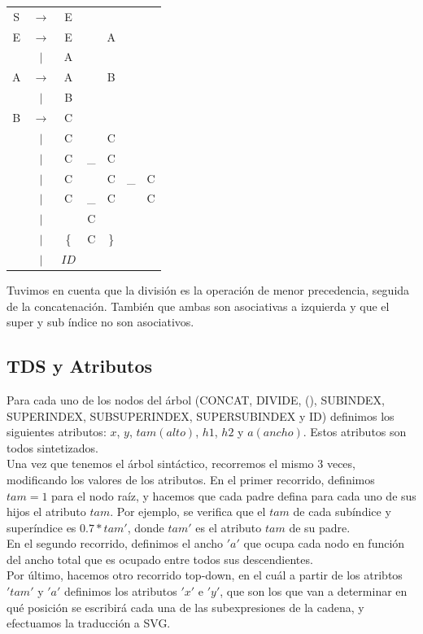 \documentclass[a4paper, 10pt, twoside]{article}
\begin{document}
\begin{table}[ht]
\begin{tabular} {c c c c c c c}

S & $\rightarrow$ & E &                   &   & & \\
E & $\rightarrow$ & E & \detokenize{/}    & A & & \\
  & $|$           & A &                   &   & & \\
A & $\rightarrow$ & A &                   & B & & \\
  & $|$           & B &                   &   & & \\
B & $\rightarrow$ & C &                   &   & & \\
  & $|$           & C & \detokenize{^}    & C & & \\
  & $|$           & C & \_                & C & & \\
  & $|$           & C & \detokenize{^}    & C & \_  & C \\
  & $|$           & C & \_                & C & \detokenize{^} & C \\
  & $|$           & \detokenize{(}        & C & \detokenize{)} & & \\
  & $|$           & \{                    & C & \} & & \\
  & $|$           & $ID$                  & & & & \\

\end{tabular}
\end{table}

Tuvimos en cuenta que la división es la operación de menor precedencia, seguida de la concatenación. También que ambas son asociativas a izquierda y que el super y sub índice no son asociativos.

\subsection{TDS y Atributos}
Para cada uno de los nodos del árbol (CONCAT, DIVIDE, (), SUBINDEX, SUPERINDEX, SUBSUPERINDEX, SUPERSUBINDEX
y ID) definimos los siguientes atributos: $x$, $y$, $tam (alto)$, $h1$, $h2$ y $a (ancho)$. Estos atributos son todos sintetizados. \\

Una vez que tenemos el árbol sintáctico, recorremos el mismo 3 veces, modificando los valores de los atributos.
En el primer recorrido, definimos $tam = 1$ para el nodo raíz, y  hacemos que cada padre defina para cada uno de sus hijos el atributo $tam$. Por ejemplo, se verifica que el $tam$ de cada subíndice y superíndice es $0.7 * tam'$, donde $tam'$ es el atributo $tam$ de su padre. \\
En el segundo recorrido, definimos el ancho $'a'$ que ocupa cada nodo en función del ancho total que es ocupado entre todos sus descendientes. \\
Por último, hacemos otro recorrido top-down, en el cuál a partir de los atribtos $'tam'$ y $'a'$ definimos los atributos $'x'$ e $'y'$, que son los que van a determinar en qué posición se escribirá cada una de las subexpresiones de la cadena, y efectuamos la traducción a SVG.
\end{document}
